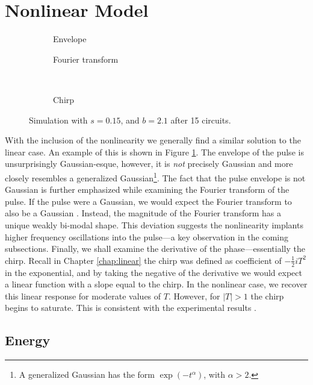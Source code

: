 \section{Nonlinear Model}
\begin{figure}[tbp]
\centering
\begin{subfigure}{0.5\textwidth}
\centering

\caption{Envelope}
\end{subfigure}%
\begin{subfigure}{0.5\textwidth}
\centering

\caption{Fourier transform}
\end{subfigure} \\
\begin{subfigure}{0.5\textwidth}
\centering

\caption{Chirp}
\end{subfigure}
\caption[Envelope, Fourier transform, and chirp of the pulse---stable case.]{Simulation with $s = 0.15$, and $b = 2.1$ after 15 circuits.}
\label{fig:nlstable}
\end{figure}
With the inclusion of the nonlinearity we generally find a similar solution to the linear case. An example of this is shown in Figure \ref{fig:nlstable}. The envelope of the pulse is unsurprisingly Gaussian-esque, however, it is \emph{not} precisely Gaussian and more closely resembles a generalized Gaussian\footnote{A generalized Gaussian has the form $\exp \left(-t^\alpha \right)$, with $\alpha > 2$.}. The fact that the pulse envelope is not Gaussian is further emphasized while examining the Fourier transform of the pulse. If the pulse were a Gaussian, we would expect the Fourier transform to also be a Gaussian \cite{debnath, gradshteyn}. Instead, the magnitude of the Fourier transform has a unique weakly bi-modal shape. This deviation suggests the nonlinearity implants higher frequency oscillations into the pulse---a key observation in the coming subsections. Finally, we shall examine the derivative of the phase---essentially the chirp. Recall in Chapter \ref{chap:linear} the chirp was defined as coefficient of $-\frac{1}{2}iT^2$ in the exponential, and by taking the negative of the derivative we would expect a linear function with a slope equal to the chirp. In the nonlinear case, we recover this linear response for moderate values of $T$. However, for $|T| > 1$ the chirp begins to saturate. This is consistent with the experimental results \cite{chen, rothenberg, tomlinson}. \\

\subsection{Energy}
\label{chap:energy}


